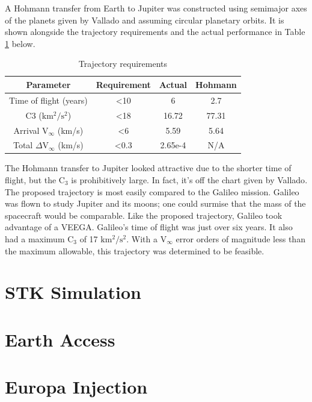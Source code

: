 \documentclass[]{aiaa-tc}%
\begin{document}
	\vspace{5 mm}

A Hohmann transfer from Earth to Jupiter was constructed using semimajor axes of the planets given by Vallado\cite{Vallado} and assuming circular planetary orbits. It is shown alongside the trajectory requirements and the actual performance in Table \ref{TrajReqs} below. 
\begin{table}[H]
\centering
\caption{Trajectory requirements}
\label{TrajReqs}
\begin{tabular}{|c|c|c|c|}
\hline
\rowcolor[HTML]{C0C0C0} 
\textbf{Parameter}     & \textbf{Requirement} & \textbf{Actual}& \textbf{Hohmann} \\ \hline
Time of flight (years) & \textless10          & 6       & 2.7        \\ \hline
C3 ($\mathrm{km^2/s^2}$)              & \textless18          & 16.72     & 77.31      \\ \hline
Arrival V$_\infty$ (km/s)       & \textless6           & 5.59       & 5.64     \\ \hline
Total $\Delta$V$_\infty$ (km/s)         & \textless0.3           & 2.65e-4    & N/A     \\ \hline
\end{tabular}
\end{table}
The Hohmann transfer to Jupiter looked attractive due to the shorter time of flight, but the C$_3$ is prohibitively large. In fact, it's off the chart given by Vallado\cite{Vallado}. The proposed trajectory is most easily compared to the Galileo mission. Galileo was flown to study Jupiter and its moons; one could surmise that the mass of the spacecraft would be comparable. Like the proposed trajectory, Galileo took advantage of a VEEGA. Galileo's time of flight was just over six years. It also had a maximum C$_3$ of 17 $\mathrm{km^2/s^2}$\cite{Damario}. With a V$_\infty$ error orders of magnitude less than the maximum allowable, this trajectory was determined to be feasible.

	\section{STK Simulation}

	\section{Earth Access}

	\section{Europa Injection}
\end{document}
